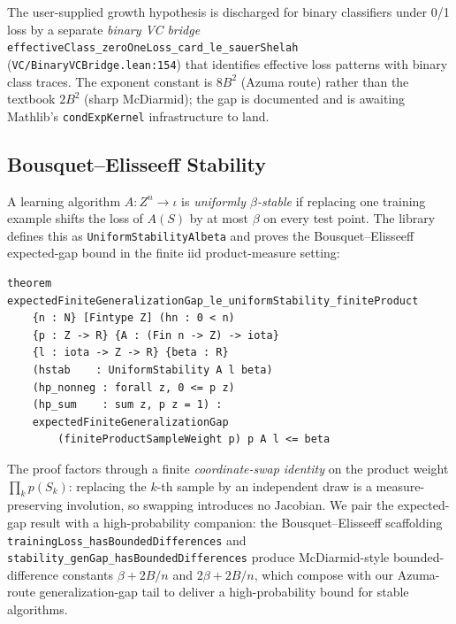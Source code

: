 \documentclass[10pt,twocolumn,letterpaper]{article}
\begin{document}
\noindent
The user-supplied growth hypothesis is discharged for binary
classifiers under 0/1 loss by a separate \emph{binary VC bridge}
\texttt{effectiveClass\_zeroOneLoss\_card\_le\_sauerShelah}
(\texttt{VC/BinaryVCBridge.lean:154}) that identifies effective loss
patterns with binary class traces. The exponent constant is
$8B^2$ (Azuma route) rather than the textbook $2B^2$ (sharp
McDiarmid); the gap is documented and is awaiting Mathlib's
\texttt{condExpKernel} infrastructure to land.

\subsection{Bousquet--Elisseeff Stability}
\label{sec:stab}

A learning algorithm $A : Z^n \to \iota$ is \emph{uniformly $\beta$-stable}
if replacing one training example shifts the loss of $A(S)$ by at most
$\beta$ on every test point. The library defines this as
\texttt{UniformStability\;A\;l\;beta} and proves the Bousquet--Elisseeff
expected-gap bound in the finite iid product-measure setting:

\begin{lstlisting}[caption={Finite iid Bousquet--Elisseeff expected
                  generalization-gap bound
                  (\texttt{FormalSLT/AlgorithmicStability.lean:1604}).},
                  label={lst:stab},
                  basicstyle=\ttfamily\tiny]
theorem expectedFiniteGeneralizationGap_le_uniformStability_finiteProduct
    {n : N} [Fintype Z] (hn : 0 < n)
    {p : Z -> R} {A : (Fin n -> Z) -> iota}
    {l : iota -> Z -> R} {beta : R}
    (hstab    : UniformStability A l beta)
    (hp_nonneg : forall z, 0 <= p z)
    (hp_sum    : sum z, p z = 1) :
    expectedFiniteGeneralizationGap
        (finiteProductSampleWeight p) p A l <= beta
\end{lstlisting}

\noindent
The proof factors through a finite \emph{coordinate-swap identity} on
the product weight $\prod_k p(S_k)$: replacing the $k$-th sample by an
independent draw is a measure-preserving involution, so swapping
introduces no Jacobian. We pair the expected-gap result with a
high-probability companion: the Bousquet--Elisseeff scaffolding
\texttt{trainingLoss\_hasBoundedDifferences} and
\texttt{stability\_genGap\_hasBoundedDifferences} produce
McDiarmid-style bounded-difference constants $\beta + 2B/n$ and
$2\beta + 2B/n$, which compose with our Azuma-route generalization-gap
tail to deliver a high-probability bound for stable algorithms.
\end{document}
